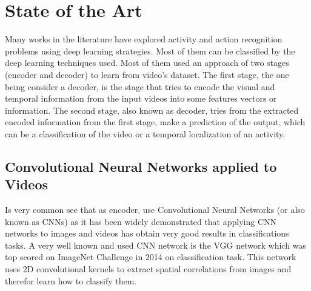 \chapter{State of the Art}




Many works in the literature have explored activity and action recognition problems using deep learning strategies. Most of them can be classified by the deep learning techniques used. Most of them used an approach of two stages (encoder and decoder) to learn from video's dataset. The first stage, the one being consider a decoder, is the stage that tries to encode the visual and temporal information from the input videos into some features vectors or information. The second stage, also known as decoder, tries from the extracted encoded information from the first stage, make a prediction of the output, which can be a classification of the video or a temporal localization of an activity.

\section{Convolutional Neural Networks applied to Videos}

Is very common see that as encoder, use Convolutional Neural Networks (or also known as CNNs) as it has been widely demonstrated that applying CNN networks to images and videos has obtain very good results in classifications tasks. A very well known and used CNN network is the VGG\cite{Simonyan14c} network which was top scored on ImageNet Challenge in 2014 on classification task. This network uses 2D convolutional kernels to extract spatial correlations from images and therefor learn how to classify them. 

